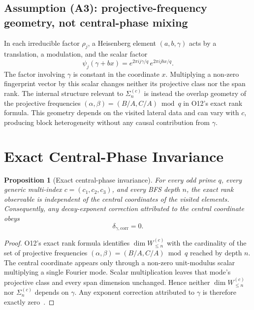 \documentclass[11pt]{article}
\newtheorem{proposition}[theorem]{Proposition}
\begin{document}
  \subsection{Assumption (A3): projective-frequency geometry, not central-phase mixing}
    \label{sec:a3}

    In each irreducible factor $\rho_j$, a Heisenberg element $(a,b,\gamma)$ acts by a translation,
    a modulation, and the scalar factor
    \begin{equation}
      \label{eq:phase}
      \psi_j(\gamma + bx) = e^{2\pi i j\gamma/q}\,e^{2\pi i jbx/q}.
    \end{equation}
    The factor involving $\gamma$ is constant in the coordinate $x$.
    Multiplying a non-zero fingerprint vector by this scalar changes neither its projective class nor
    the span rank.
    The internal structure relevant to $\Sigma_n^{(c)}$ is instead the overlap geometry of the
    projective frequencies $(\alpha,\beta)=(B/A,C/A)\bmod q$ in O12's exact rank formula.
    This geometry depends on the visited lateral data and can vary with $c$, producing block
    heterogeneity without any causal contribution from $\gamma$.

  \section{Exact Central-Phase Invariance}
  \label{sec:decomposition}

  \begin{proposition}[Exact central-phase invariance]
    \label{prop:gamma_bias}
    For every odd prime $q$, every generic multi-index $c=(c_1,c_2,c_3)$, and every BFS depth $n$,
    the exact rank observable is independent of the central coordinates of the visited elements.
    Consequently, any decay-exponent correction attributed to the central coordinate obeys
    \begin{equation}
      \label{eq:gamma_bias}
      \delta_{\gamma,\mathrm{corr}}=0.
    \end{equation}
  \end{proposition}

  \begin{proof}
    O12's exact rank formula identifies $\dim W_{\leq n}^{(c)}$ with the cardinality of the set of
    projective frequencies $(\alpha,\beta)=(B/A,C/A)\bmod q$ reached by depth $n$.
    The central coordinate appears only through a non-zero unit-modulus scalar multiplying a single
    Fourier mode.
    Scalar multiplication leaves that mode's projective class and every span dimension unchanged.
    Hence neither $\dim W_{\leq n}^{(c)}$ nor $\Sigma_n^{(c)}$ depends on $\gamma$.
    Any exponent correction attributed to $\gamma$ is therefore exactly zero~\cite{Beau2026a16}.
  \end{proof}
\end{document}
